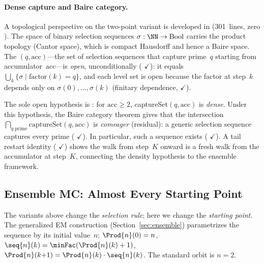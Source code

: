 \paragraph{Dense capture and Baire category.}
A topological perspective on the two-point variant is developed in
 (301~lines, zero ).
The space of binary selection sequences $\sigma : \NN \to \mathrm{Bool}$
carries the product topology (Cantor space), which is compact Hausdorff
and hence a Baire space.  The $(q, \mathrm{acc})$---the
set of selection sequences that capture prime~$q$ starting from
accumulator~$\mathrm{acc}$---is \emph{open}, unconditionally
(
{\color{leanink}$\checkmark$}):
it equals $\bigcup_k \{\sigma \mid \mathrm{factor}(k) = q\}$,
and each level set is open because the factor at step~$k$
depends only on $\sigma(0), \ldots, \sigma(k)$ (finitary dependence,
{\color{leanink}$\checkmark$}).

The sole open hypothesis is : for
$\mathrm{acc} \geq 2$, captureSet$(q, \mathrm{acc})$ is \emph{dense}.
Under this hypothesis, the Baire category theorem gives that the
intersection $\bigcap_{q\;\text{prime}} \mathrm{captureSet}(q, \mathrm{acc})$
is \emph{comeager} (residual): a generic selection sequence captures
every prime
(
{\color{leanink}$\checkmark$}).
In particular, such a sequence exists
(
{\color{leanink}$\checkmark$}).
A tail restart identity
(
{\color{leanink}$\checkmark$})
shows the walk from step~$K$ onward is a fresh walk from the
accumulator at step~$K$, connecting the density hypothesis to
the ensemble framework.


\subsection{Ensemble MC: Almost Every Starting Point}
\label{sec:ensemble-variant}

The variants above change the \emph{selection rule}; here we change the
\emph{starting point}.  The generalized EM construction
(Section~\ref{sec:ensemble}) parametrizes the sequence by its initial
value~$n$: $\Prod{n}(0) = n$,
$\seq{n}(k) = \minFac(\Prod{n}(k)+1)$,
$\Prod{n}(k{+}1) = \Prod{n}(k)\cdot\seq{n}(k)$.
The standard orbit is $n = 2$.

